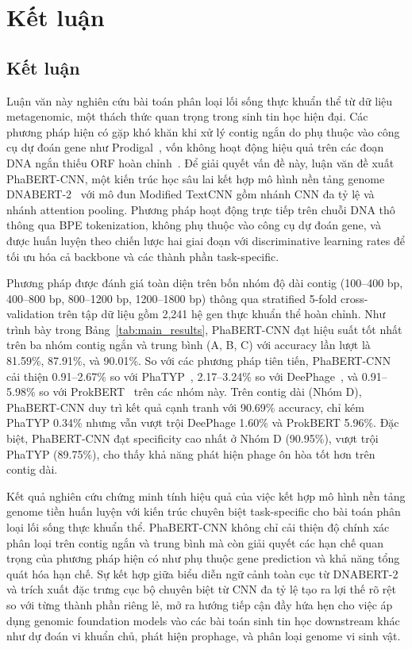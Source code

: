 \chapter{Kết luận}
\label{chap:conclusion}

\section{Kết luận}
\label{sec:conclusion}

Luận văn này nghiên cứu bài toán phân loại lối sống thực khuẩn thể từ dữ liệu metagenomic, một thách thức quan trọng trong sinh tin học hiện đại. Các phương pháp hiện có gặp khó khăn khi xử lý contig ngắn do phụ thuộc vào công cụ dự đoán gene như Prodigal~\cite{hyatt2010prodigal}, vốn không hoạt động hiệu quả trên các đoạn DNA ngắn thiếu ORF hoàn chỉnh~\cite{trimble2012short}. Để giải quyết vấn đề này, luận văn đề xuất PhaBERT-CNN, một kiến trúc học sâu lai kết hợp mô hình nền tảng genome DNABERT-2~\cite{zhou2023dnabert} với mô đun Modified TextCNN gồm nhánh CNN đa tỷ lệ và nhánh attention pooling. Phương pháp hoạt động trực tiếp trên chuỗi DNA thô thông qua BPE tokenization, không phụ thuộc vào công cụ dự đoán gene, và được huấn luyện theo chiến lược hai giai đoạn với discriminative learning rates để tối ưu hóa cả backbone và các thành phần task-specific.

Phương pháp được đánh giá toàn diện trên bốn nhóm độ dài contig (100--400 bp, 400--800 bp, 800--1200 bp, 1200--1800 bp) thông qua stratified 5-fold cross-validation trên tập dữ liệu gồm 2,241 hệ gen thực khuẩn thể hoàn chỉnh. Như trình bày trong Bảng~\ref{tab:main_results}, PhaBERT-CNN đạt hiệu suất tốt nhất trên ba nhóm contig ngắn và trung bình (A, B, C) với accuracy lần lượt là 81.59\%, 87.91\%, và 90.01\%. So với các phương pháp tiên tiến, PhaBERT-CNN cải thiện 0.91--2.67\% so với PhaTYP~\cite{shang2023phatyp}, 2.17--3.24\% so với DeePhage~\cite{wu2021deephage}, và 0.91--5.98\% so với ProkBERT~\cite{ligeti2024prokbert} trên các nhóm này. Trên contig dài (Nhóm D), PhaBERT-CNN duy trì kết quả cạnh tranh với 90.69\% accuracy, chỉ kém PhaTYP 0.34\% nhưng vẫn vượt trội DeePhage 1.60\% và ProkBERT 5.96\%. Đặc biệt, PhaBERT-CNN đạt specificity cao nhất ở Nhóm D (90.95\%), vượt trội PhaTYP (89.75\%), cho thấy khả năng phát hiện phage ôn hòa tốt hơn trên contig dài.

Kết quả nghiên cứu chứng minh tính hiệu quả của việc kết hợp mô hình nền tảng genome tiền huấn luyện với kiến trúc chuyên biệt task-specific cho bài toán phân loại lối sống thực khuẩn thể. PhaBERT-CNN không chỉ cải thiện độ chính xác phân loại trên contig ngắn và trung bình mà còn giải quyết các hạn chế quan trọng của phương pháp hiện có như phụ thuộc gene prediction và khả năng tổng quát hóa hạn chế. Sự kết hợp giữa biểu diễn ngữ cảnh toàn cục từ DNABERT-2 và trích xuất đặc trưng cục bộ chuyên biệt từ CNN đa tỷ lệ tạo ra lợi thế rõ rệt so với từng thành phần riêng lẻ, mở ra hướng tiếp cận đầy hứa hẹn cho việc áp dụng genomic foundation models vào các bài toán sinh tin học downstream khác như dự đoán vi khuẩn chủ, phát hiện prophage, và phân loại genome vi sinh vật.

